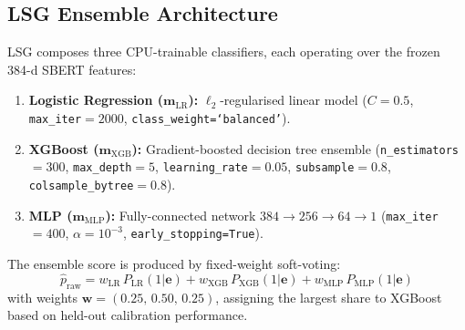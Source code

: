 \documentclass[conference]{IEEEtran}
\begin{document}
\subsection{LSG Ensemble Architecture}
LSG composes three CPU-trainable classifiers, each operating
over the frozen 384-d SBERT features:

\begin{enumerate}
  \item \textbf{Logistic Regression ($\mathbf{m}_{\mathrm{LR}}$):}
    $\ell_2$-regularised linear model
    ($C{=}0.5$, \texttt{max\_iter}$=2000$,
    \texttt{class\_weight=`balanced'}).

  \item \textbf{XGBoost ($\mathbf{m}_{\mathrm{XGB}}$):}
    Gradient-boosted decision tree ensemble
    (\texttt{n\_estimators}$=300$,
    \texttt{max\_depth}$=5$,
    \texttt{learning\_rate}$=0.05$,
    \texttt{subsample}$=0.8$,
    \texttt{colsample\_bytree}$=0.8$).

  \item \textbf{MLP ($\mathbf{m}_{\mathrm{MLP}}$):}
    Fully-connected network $384 \to 256 \to 64 \to 1$
    (\texttt{max\_iter}$=400$, $\alpha{=}10^{-3}$,
    \texttt{early\_stopping=True}).
\end{enumerate}

The ensemble score is produced by fixed-weight soft-voting:
\begin{equation}
  \hat{p}_{\mathrm{raw}} =
    w_{\mathrm{LR}}\,P_{\mathrm{LR}}(1|\mathbf{e}) +
    w_{\mathrm{XGB}}\,P_{\mathrm{XGB}}(1|\mathbf{e}) +
    w_{\mathrm{MLP}}\,P_{\mathrm{MLP}}(1|\mathbf{e})
\end{equation}
with weights $\mathbf{w} = (0.25,\,0.50,\,0.25)$, assigning
the largest share to XGBoost based on held-out calibration
performance.
\end{document}
